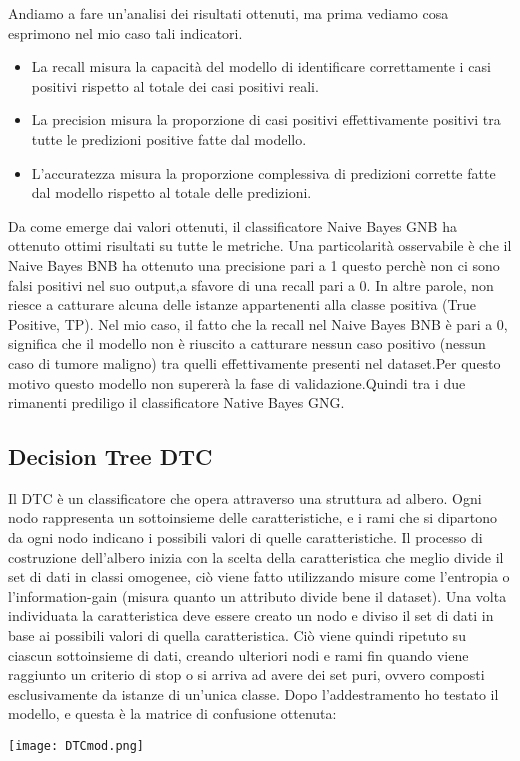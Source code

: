 \documentclass{article}
\begin{document}
Andiamo a fare un’analisi dei risultati ottenuti, ma prima vediamo cosa esprimono nel mio caso
tali indicatori.
\begin{itemize}
    \item La recall misura la capacità del modello di identificare correttamente i casi positivi rispetto al totale dei casi positivi reali.
    \item La precision misura la proporzione di casi positivi effettivamente positivi tra tutte le predizioni positive fatte dal modello.
    \item L'accuratezza misura la proporzione complessiva di predizioni corrette fatte dal modello rispetto al totale delle predizioni.
\end{itemize}
Da come emerge dai valori ottenuti, il classificatore Naive Bayes GNB ha ottenuto ottimi risultati su tutte le metriche. Una particolarità osservabile è che il Naive Bayes BNB ha ottenuto una precisione pari a 1 questo perchè non ci sono falsi positivi nel suo output,a sfavore di una recall pari a 0. In altre parole, non riesce a catturare alcuna delle istanze appartenenti alla classe positiva (True Positive, TP).
Nel mio caso, il fatto che la recall nel Naive Bayes BNB è pari a 0, significa che il modello non è riuscito a catturare nessun caso positivo (nessun caso di tumore maligno) tra quelli effettivamente presenti nel dataset.Per questo motivo questo modello non supererà la fase di validazione.Quindi tra i due rimanenti prediligo il classificatore Native Bayes GNG.

\newpage
\subsection{Decision Tree DTC}
Il DTC è un classificatore che opera attraverso una struttura ad albero. Ogni nodo rappresenta un sottoinsieme delle caratteristiche, e i rami che si dipartono da ogni nodo indicano i possibili valori di quelle caratteristiche. Il processo di costruzione dell’albero inizia con la scelta della caratteristica che meglio divide il set di dati in classi omogenee, ciò viene fatto utilizzando misure come l’entropia o l’information-gain (misura quanto un attributo divide bene il dataset). Una volta individuata la caratteristica deve essere creato un nodo e diviso il set di dati in base ai possibili valori di quella caratteristica. Ciò viene quindi ripetuto su ciascun sottoinsieme di dati, creando ulteriori nodi e rami fin quando viene raggiunto un criterio di stop o si arriva ad avere dei set puri, ovvero composti esclusivamente da istanze di un’unica classe. Dopo l’addestramento ho testato il modello, e questa è la matrice di confusione ottenuta:
\begin{center}
  \texttt{[image: DTCmod.png]}
\end{center}
\end{document}
